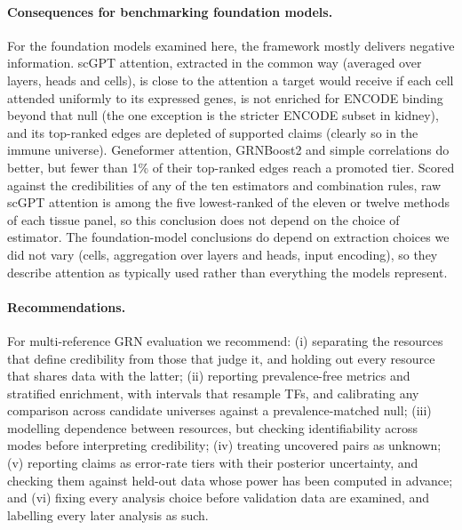 \documentclass[11pt,a4paper]{article}
\begin{document}
\paragraph{Consequences for benchmarking foundation models.}
For the foundation models examined here, the framework mostly delivers negative information.
scGPT attention, extracted in the common way (averaged over layers, heads and cells), is close to the attention a target would receive if each cell attended uniformly to its expressed genes, is not enriched for ENCODE binding beyond that null (the one exception is the stricter ENCODE subset in kidney), and its top-ranked edges are depleted of supported claims (clearly so in the immune universe).
Geneformer attention, GRNBoost2 and simple correlations do better, but fewer than 1\% of their top-ranked edges reach a promoted tier.
Scored against the credibilities of any of the ten estimators and combination rules, raw scGPT attention is among the five lowest-ranked of the eleven or twelve methods of each tissue panel, so this conclusion does not depend on the choice of estimator.
The foundation-model conclusions do depend on extraction choices we did not vary (cells, aggregation over layers and heads, input encoding), so they describe attention as typically used rather than everything the models represent.

\paragraph{Recommendations.}
For multi-reference GRN evaluation we recommend:
(i) separating the resources that define credibility from those that judge it, and holding out every resource that shares data with the latter;
(ii) reporting prevalence-free metrics and stratified enrichment, with intervals that resample TFs, and calibrating any comparison across candidate universes against a prevalence-matched null;
(iii) modelling dependence between resources, but checking identifiability across modes before interpreting credibility;
(iv) treating uncovered pairs as unknown;
(v) reporting claims as error-rate tiers with their posterior uncertainty, and checking them against held-out data whose power has been computed in advance; and
(vi) fixing every analysis choice before validation data are examined, and labelling every later analysis as such.
\end{document}
